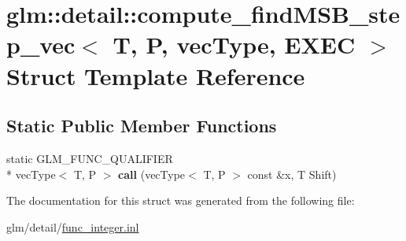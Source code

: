 \hypertarget{structglm_1_1detail_1_1compute__findMSB__step__vec}{\section{glm\-:\-:detail\-:\-:compute\-\_\-find\-M\-S\-B\-\_\-step\-\_\-vec$<$ T, P, vec\-Type, E\-X\-E\-C $>$ Struct Template Reference}
\label{structglm_1_1detail_1_1compute__findMSB__step__vec}
}
\subsection*{Static Public Member Functions}
\begin{DoxyCompactItemize}
\item 
\hypertarget{structglm_1_1detail_1_1compute__findMSB__step__vec_af4ab89696a02cfcbc5d96dff9e92521c}{static G\-L\-M\-\_\-\-F\-U\-N\-C\-\_\-\-Q\-U\-A\-L\-I\-F\-I\-E\-R \\*
vec\-Type$<$ T, P $>$ {\bfseries call} (vec\-Type$<$ T, P $>$ const \&x, T Shift)}\label{structglm_1_1detail_1_1compute__findMSB__step__vec_af4ab89696a02cfcbc5d96dff9e92521c}

\end{DoxyCompactItemize}


The documentation for this struct was generated from the following file\-:\begin{DoxyCompactItemize}
\item 
glm/detail/\hyperlink{func__integer_8inl}{func\-\_\-integer.\-inl}\end{DoxyCompactItemize}
